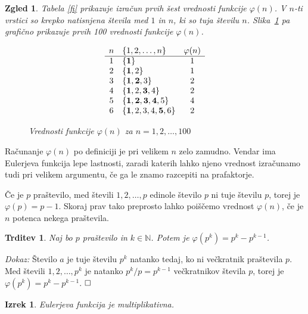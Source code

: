 \documentclass[a4paper,12pt]{article}
\def\N{\mathbb{N}} %
\def\qed{$\hfill\Box$}   %
\newtheorem{izrek}{Izrek}
\newtheorem{trditev}{Trditev}
\newtheorem{zgled}{Zgled}
\begin{document}
\begin{zgled}
Tabela \ref{fi} prikazuje izračun prvih šest vrednosti funkcije $\varphi(n)$. V $n$-ti vrstici so 
krepko natisnjena števila med $1$ in $n$, ki so tuja številu $n$. Slika~\ref{fi100} pa grafično prikazuje prvih 100 vrednosti funkcije $\varphi(n)$.
\begin{table}[h]
\[
\begin{array}{clc}
 n & \{1,2,\ldots, n\}          & \varphi(n)       \\
 \hline
 1 & \{{\bf 1}\}                    &     1      \\
 2 & \{{\bf 1},2 \}                &     1      \\
 3 & \{{\bf 1,2},3 \}             &     2      \\
 4 & \{{\bf 1},2,{\bf 3},4 \} &     2      \\
 5 & \{{\bf 1,2,3,4},5 \}       &     4      \\
 6 & \{{\bf 1},2,3,4,{\bf 5},6 \} &     2
\end{array}
\] 
\caption{Vrednosti funkcije $\varphi(n)$ za $n = 1,2,\ldots,6$}\label{fi}
\end{table}

\begin{figure}[h]
\caption{Vrednosti funkcije $\varphi(n)$ za $n = 1,2,\ldots,100$}\label{fi100}
\end{figure}
\end{zgled}

Računanje $\varphi(n)$ po definiciji je pri velikem $n$ zelo zamudno. Vendar ima 
Eulerjeva funkcija lepe lastnosti, zaradi katerih lahko njeno vrednost izračunamo
tudi pri velikem argumentu, če ga le znamo razcepiti na prafaktorje.

Če je $p$ praštevilo, med števili $1,2,\ldots, p$ edinole število $p$ ni tuje številu $p$,
torej je $\varphi(p) = p-1$. Skoraj prav tako preprosto lahko poiščemo vrednost $\varphi(n)$,
če je $n$ potenca nekega praštevila.

\begin{trditev}
\label{fipp}
Naj bo $p$ praštevilo in $k \in \N$. Potem je $\varphi(p^k) = p^k-p^{k-1}$.
\end{trditev}

\noindent
{\em Dokaz:\/} Število $a$ je tuje številu $p^k$ natanko tedaj, ko ni večkratnik praštevila $p$.
Med števili $1,2,\ldots, p^k$ je natanko $p^k/p = p^{k-1}$ večkratnikov števila $p$, torej je $\varphi(p^k) = p^k-p^{k-1}$. 
\qed

\begin{izrek}
\label{fimult}
Eulerjeva funkcija je multiplikativna.
\end{izrek}
\end{document}
